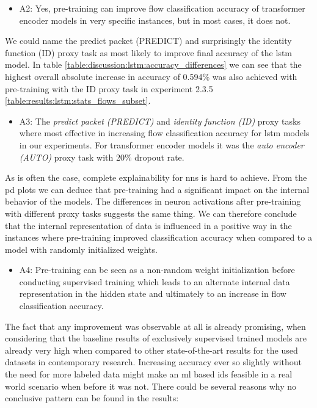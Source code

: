 \begin{itemize}
	\item A2: Yes, pre-training can improve flow classification accuracy of transformer encoder models in very specific instances, but in most cases, it does not.
\end{itemize}

We could name the predict packet (PREDICT) and surprisingly the identity function (ID) proxy task as most likely to improve final accuracy of the \gls{lstm} model. In table \ref{table:discussion:lstm:accuracy_differences} we can see that the highest overall absolute increase in accuracy of 0.594\% was also achieved with pre-training with the ID proxy task in experiment 2.3.5 \ref{table:results:lstm:stats_flows_subset}. \par

\begin{itemize}
	\item A3: The \textit{predict packet (PREDICT)} and \textit{identity function (ID)} proxy tasks where most effective in increasing flow classification accuracy for \gls{lstm} models in our experiments. For transformer encoder models it was the \textit{auto encoder (AUTO)} proxy task with 20\% dropout rate.
\end{itemize}

As is often the case, complete explainability for \glspl{nn} is hard to achieve. From the \gls{pd} plots we can deduce that pre-training had a significant impact on the internal behavior of the models. The differences in neuron activations after pre-training with different proxy tasks suggests the same thing. We can therefore conclude that the internal representation of data is influenced in a positive way in the instances where pre-training improved classification accuracy when compared to a model with randomly initialized weights.

\begin{itemize}
	\item A4: Pre-training can be seen as a non-random weight initialization before conducting supervised training which leads to an alternate internal data representation in the hidden state and ultimately to an increase in flow classification accuracy.
\end{itemize}


The fact that any improvement was observable at all is already promising, when considering that the baseline results of exclusively supervised trained models are already very high when compared to other state-of-the-art results for the used datasets in contemporary research. Increasing accuracy ever so slightly without the need for more labeled data might make an \gls{ml} based \gls{ids} feasible in a real world scenario when before it was not. There could be several reasons why no conclusive pattern can be found in the results: \par

